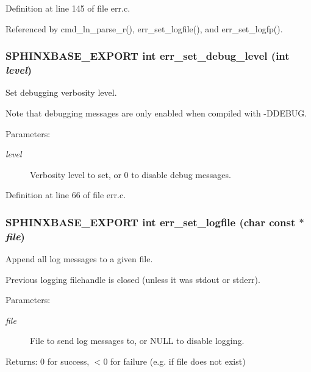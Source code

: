 Definition at line 145 of file err.c.

Referenced by cmd\_\-ln\_\-parse\_\-r(), err\_\-set\_\-logfile(), and err\_\-set\_\-logfp().
\subsubsection[{err\_\-set\_\-debug\_\-level}]{\setlength{\rightskip}{0pt plus 5cm}SPHINXBASE\_\-EXPORT int err\_\-set\_\-debug\_\-level (int {\em level})}\label{err_8h_b77fa009824260d9f103308272dc89b8}


Set debugging verbosity level. 

Note that debugging messages are only enabled when compiled with -DDEBUG.

\begin{Desc}
\item[Parameters:]
\begin{description}
\item[{\em level}]Verbosity level to set, or 0 to disable debug messages. \end{description}
\end{Desc}


Definition at line 66 of file err.c.
\subsubsection[{err\_\-set\_\-logfile}]{\setlength{\rightskip}{0pt plus 5cm}SPHINXBASE\_\-EXPORT int err\_\-set\_\-logfile (char const $\ast$ {\em file})}\label{err_8h_a605de73499066475ec4cfb03e4c5a20}


Append all log messages to a given file. 

Previous logging filehandle is closed (unless it was stdout or stderr).

\begin{Desc}
\item[Parameters:]
\begin{description}
\item[{\em file}]File to send log messages to, or NULL to disable logging. \end{description}
\end{Desc}
\begin{Desc}
\item[Returns:]0 for success, $<$0 for failure (e.g. if file does not exist) \end{Desc}


